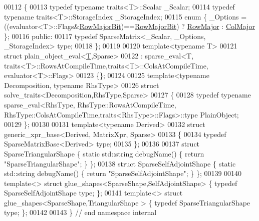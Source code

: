 \begin{DoxyCode}
00112 \{
00113   \textcolor{keyword}{typedef} \textcolor{keyword}{typename} traits<T>::Scalar \_Scalar;
00114   \textcolor{keyword}{typedef} \textcolor{keyword}{typename} traits<T>::StorageIndex \_StorageIndex;
00115   \textcolor{keyword}{enum} \{ \_Options = ((evaluator<T>::Flags&\hyperlink{group__flags_gae4f56c2a60bbe4bd2e44c5b19cbe8762}{RowMajorBit})==\hyperlink{group__flags_gae4f56c2a60bbe4bd2e44c5b19cbe8762}{RowMajorBit}) ? 
      \hyperlink{group__enums_ggaacded1a18ae58b0f554751f6cdf9eb13acfcde9cd8677c5f7caf6bd603666aae3}{RowMajor} : \hyperlink{group__enums_ggaacded1a18ae58b0f554751f6cdf9eb13a0cbd4bdd0abcfc0224c5fcb5e4f6669a}{ColMajor} \};
00116   \textcolor{keyword}{public}:
00117     \textcolor{keyword}{typedef} SparseMatrix<\_Scalar, \_Options, \_StorageIndex> type;
00118 \};
00119 
00120 \textcolor{keyword}{template}<\textcolor{keyword}{typename} T>
00121 \textcolor{keyword}{struct }plain\_object\_eval<\hyperlink{group___sparse_core___module_class_eigen_1_1_triplet}{T},Sparse>
00122   : sparse\_eval<T, traits<T>::RowsAtCompileTime,traits<T>::ColsAtCompileTime, evaluator<T>::Flags>
00123 \{\};
00124 
00125 \textcolor{keyword}{template}<\textcolor{keyword}{typename} Decomposition, \textcolor{keyword}{typename} RhsType>
00126 \textcolor{keyword}{struct }solve\_traits<Decomposition,RhsType,Sparse>
00127 \{
00128   \textcolor{keyword}{typedef} \textcolor{keyword}{typename} sparse\_eval<RhsType, RhsType::RowsAtCompileTime,
       RhsType::ColsAtCompileTime,traits<RhsType>::Flags>::type PlainObject;
00129 \};
00130 
00131 \textcolor{keyword}{template}<\textcolor{keyword}{typename} Derived>
00132 \textcolor{keyword}{struct }generic\_xpr\_base<Derived, MatrixXpr, Sparse>
00133 \{
00134   \textcolor{keyword}{typedef} SparseMatrixBase<Derived> type;
00135 \};
00136 
00137 \textcolor{keyword}{struct }SparseTriangularShape  \{ \textcolor{keyword}{static} std::string debugName() \{ \textcolor{keywordflow}{return} \textcolor{stringliteral}{"SparseTriangularShape"}; \} \};
00138 \textcolor{keyword}{struct }SparseSelfAdjointShape \{ \textcolor{keyword}{static} std::string debugName() \{ \textcolor{keywordflow}{return} \textcolor{stringliteral}{"SparseSelfAdjointShape"}; \} \};
00139 
00140 \textcolor{keyword}{template}<> \textcolor{keyword}{struct }glue\_shapes<SparseShape,SelfAdjointShape> \{ \textcolor{keyword}{typedef} SparseSelfAdjointShape type;  \};
00141 \textcolor{keyword}{template}<> \textcolor{keyword}{struct }glue\_shapes<SparseShape,TriangularShape > \{ \textcolor{keyword}{typedef} SparseTriangularShape  type;  \};
00142 
00143 \} \textcolor{comment}{// end namespace internal}

\end{DoxyCode}
